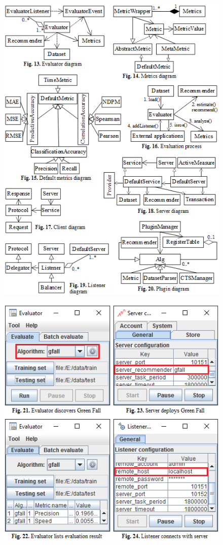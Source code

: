 \documentclass[a4paper]{llncs}
\begin{document}
\begin{figure}
\centering
\includegraphics{MultiFigures-4.png}
\end{figure}

\begin{figure}
\centering
\includegraphics{MultiFigures-5.png}
\end{figure}
\end{document}

